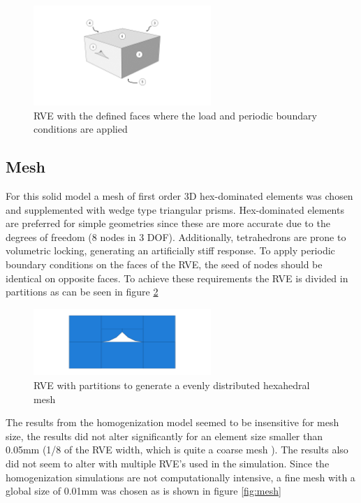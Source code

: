 \begin{figure}[H]
    \centering
    \includegraphics[width=0.60\textwidth]{chapter_6_Elasticmodelling/figures/facesRVE.png}
    \caption{RVE with the defined faces where the load and periodic boundary conditions are applied }
    \label{fig:facesRVE}
\end{figure}

\subsection{Mesh}
For this solid model a mesh of first order 3D hex-dominated elements was chosen and supplemented with wedge type triangular prisms. Hex-dominated elements are preferred for simple geometries since these are more accurate due to the degrees of freedom (8 nodes in 3 DOF). Additionally, tetrahedrons are prone to volumetric locking, generating an artificially stiff response. 
To apply periodic boundary conditions on the faces of the RVE, the seed of nodes should be identical on opposite faces. To achieve these requirements the RVE is divided in partitions as can be seen in figure \ref{fig:partition}
\begin{figure}[H]
    \centering
    \includegraphics[width=0.60\textwidth]{chapter_6_Elasticmodelling/figures/partition.png}
    \caption{RVE with partitions to generate a evenly distributed hexahedral mesh}
    \label{fig:partition}
\end{figure}
The results from the homogenization model seemed to be insensitive for mesh size, the results did not alter significantly for an element size smaller than 0.05mm (1/8 of the RVE width, which is quite a coarse mesh ). The results also did not seem to alter with multiple RVE's used in the simulation. Since the homogenization simulations are not computationally intensive, a fine mesh with a global size of 0.01mm was chosen as is shown in figure \ref{fig:mesh}

